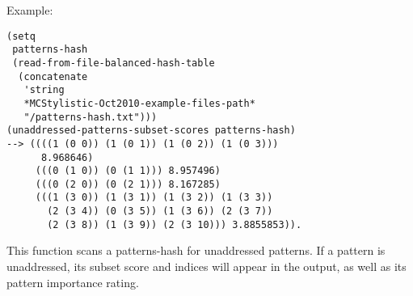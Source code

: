 \vspace{0.5cm}
\noindent Example:
\begin{verbatim}
(setq
 patterns-hash
 (read-from-file-balanced-hash-table
  (concatenate
   'string
   *MCStylistic-Oct2010-example-files-path*
   "/patterns-hash.txt")))
(unaddressed-patterns-subset-scores patterns-hash)
--> ((((1 (0 0)) (1 (0 1)) (1 (0 2)) (1 (0 3)))
      8.968646)
     (((0 (1 0)) (0 (1 1))) 8.957496)
     (((0 (2 0)) (0 (2 1))) 8.167285)
     (((1 (3 0)) (1 (3 1)) (1 (3 2)) (1 (3 3))
       (2 (3 4)) (0 (3 5)) (1 (3 6)) (2 (3 7))
       (2 (3 8)) (1 (3 9)) (2 (3 10))) 3.8855853)).
\end{verbatim}

\noindent This function scans a patterns-hash for
unaddressed patterns. If a pattern is unaddressed, its
subset score and indices will appear in the output, as
well as its pattern importance rating.




















